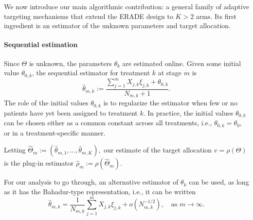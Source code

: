 We now introduce our main algorithmic contribution: a general family of adaptive targeting mechanisms that extend the ERADE design to $K> 2$ arms. Its first ingredient is an estimator of the unknown parameters and target allocation.

\paragraph*{Sequential estimation} 
Since $\Theta$ is unknown, the parameters $\theta_k$ are estimated online. Given some initial value $\theta_{0,k}$, the sequential estimator for treatment $k$ at stage $m$ is
\begin{equation}\label{eq:dbcd-estimator}
	\hat{\theta}_{m,k} := \frac{\sum_{j=1}^m X_{j,k}\xi_{j,k} + \theta_{0,k}}{N_{m,k}+1}.
\end{equation}
The role of the initial values $\theta_{0,k}$ is to regularize the estimator when few or no patients have yet been assigned to treatment $k$. In practice, the initial values $\theta_{0,k}$ can be chosen either as a common constant across all treatments, i.e., $\theta_{0,k} = \theta_0$, or in a treatment-specific manner.

Letting \(\hat{\Theta}_m := (\hat{\theta}_{m,1}, \ldots, \hat{\theta}_{m,K}),\) our estimate of the target allocation $v=\rho(\Theta)$ is the plug-in estimator $\hat{\rho}_m := \rho(\hat{\Theta}_m).$

\begin{remark}
For our analysis to go through, an alternative estimator of $\theta_k$ can be used, as long as it has the Bahadur-type representation, i.e., it can be written
\begin{equation}\label{eq:bahadur-estimator}
	\hat{\theta}_{m,k} = \frac{1}{N_{m,k}}\sum_{j=1}^{m}X_{j,k}\xi_{j,k} + o(N_{m,k}^{-1/2}),\quad \text{as } m\to\infty.
\end{equation}
\end{remark}


